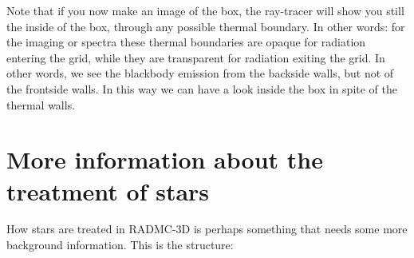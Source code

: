 \documentclass{report}
\begin{document}
Note that if you now make an image of the box, the ray-tracer will show you
still the inside of the box, through any possible thermal boundary. In other
words: for the imaging or spectra these thermal boundaries are opaque for
radiation entering the grid, while they are transparent for radiation
exiting the grid. In other words, we see the blackbody emission from the
backside walls, but not of the frontside walls. In this way we can have a
look inside the box in spite of the thermal walls.


\chapter{More information about the treatment of stars}
\label{chap-stars}
%
How stars are treated in RADMC-3D is perhaps something that needs some more
background information. This is the structure:
\end{document}
